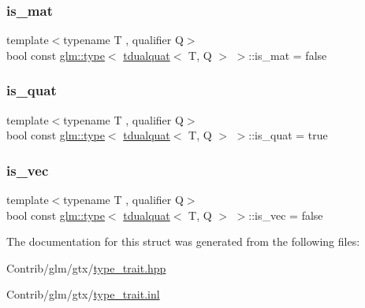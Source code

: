 \mbox{\label{structglm_1_1type_3_01tdualquat_3_01_t_00_01_q_01_4_01_4_a733a4f2d4dda8bcbf732ec5a8123ecc5}} 
\subsubsection{\texorpdfstring{is\+\_\+mat}{is\_mat}}
{\footnotesize\ttfamily template$<$typename T , qualifier Q$>$ \\
bool const \mbox{\hyperlink{structglm_1_1type}{glm\+::type}}$<$ \mbox{\hyperlink{structglm_1_1tdualquat}{tdualquat}}$<$ T, Q $>$ $>$\+::is\+\_\+mat = false\hspace{0.3cm}{\ttfamily [static]}}

\mbox{\label{structglm_1_1type_3_01tdualquat_3_01_t_00_01_q_01_4_01_4_a2205290f32121fe4f7f058c53671359e}} 
\subsubsection{\texorpdfstring{is\+\_\+quat}{is\_quat}}
{\footnotesize\ttfamily template$<$typename T , qualifier Q$>$ \\
bool const \mbox{\hyperlink{structglm_1_1type}{glm\+::type}}$<$ \mbox{\hyperlink{structglm_1_1tdualquat}{tdualquat}}$<$ T, Q $>$ $>$\+::is\+\_\+quat = true\hspace{0.3cm}{\ttfamily [static]}}

\mbox{\label{structglm_1_1type_3_01tdualquat_3_01_t_00_01_q_01_4_01_4_ab10de3a5cc6cb536a7464fbe07aadeb4}} 
\subsubsection{\texorpdfstring{is\+\_\+vec}{is\_vec}}
{\footnotesize\ttfamily template$<$typename T , qualifier Q$>$ \\
bool const \mbox{\hyperlink{structglm_1_1type}{glm\+::type}}$<$ \mbox{\hyperlink{structglm_1_1tdualquat}{tdualquat}}$<$ T, Q $>$ $>$\+::is\+\_\+vec = false\hspace{0.3cm}{\ttfamily [static]}}



The documentation for this struct was generated from the following files\+:\begin{DoxyCompactItemize}
\item 
Contrib/glm/gtx/\mbox{\hyperlink{type__trait_8hpp}{type\+\_\+trait.\+hpp}}\item 
Contrib/glm/gtx/\mbox{\hyperlink{type__trait_8inl}{type\+\_\+trait.\+inl}}\end{DoxyCompactItemize}

